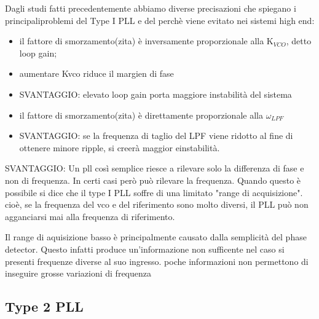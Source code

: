 Dagli studi fatti precedentemente abbiamo diverse precisazioni che spiegano i principaliproblemi del Type I PLL e del perchè viene evitato nei sistemi high end:
\begin{itemize}
    \item il fattore di smorzamento(zita) è inversamente proporzionale alla $\text{K}_{VCO}$, detto loop gain;
    \item aumentare Kvco riduce il margien di fase
    \item[-latex] SVANTAGGIO: elevato loop gain porta maggiore instabilità del sistema
\end{itemize}

\begin{itemize}
    \item il fattore di smorzamento(zita) è direttamente proporzionale alla $\omega_{LPF}$
    \item[-latex] SVANTAGGIO: se la frequenza di taglio del LPF viene ridotto al fine di ottenere minore ripple, si creerà maggior einstabilità.
\end{itemize}

SVANTAGGIO: Un pll così semplice riesce a rilevare solo la differenza di fase e non di frequenza. In certi casi però può rilevare la frequenza. Quando questo è possibile si dice che il type I PLL soffre di una limitato "range di acquisizione". cioè, se la frequenza del vco e del riferimento sono molto diversi, il PLL può non agganciarsi mai alla frequenza di riferimento.

Il range di aquisizione basso è principalmente causato dalla semplicità del phase detector. Questo infatti produce un'informazione non sufficente nel caso si presenti frequenze diverse al suo ingresso. poche informazioni non permettono di inseguire grosse variazioni di frequenza


\subsection{Type 2 PLL}

